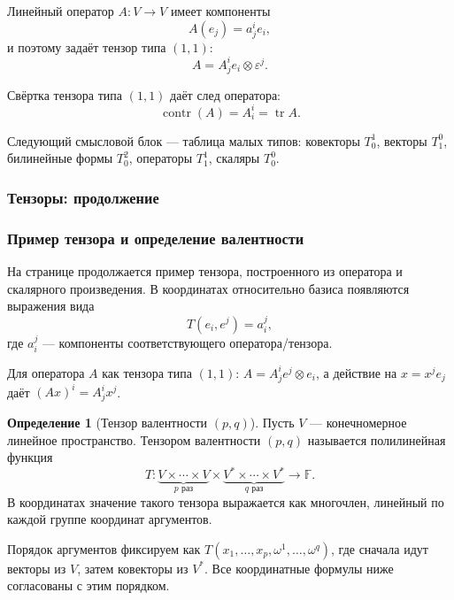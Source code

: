 \documentclass[12pt,a4paper]{article}
\theoremstyle{definition}
\newtheorem{definition}{Определение}[section]
\theoremstyle{plain}
\theoremstyle{remark}
\newenvironment{knowledgefix}{\begin{clarifybox}}{\end{clarifybox}}
\newcommand{\F}{\mathbb{F}}
\providecommand{\tr}{\operatorname{tr}}
\begin{document}
Линейный оператор $A:V\to V$ имеет компоненты
\[
    A(e_j)=a^i_j e_i,
\]
и поэтому задаёт тензор типа $(1,1)$:
\[
    A=A^i_j e_i\otimes\varepsilon^j.
\]

Свёртка тензора типа $(1,1)$ даёт след оператора:
\[
    \operatorname{contr}(A)=A^i_i=\tr A.
\]
\begin{knowledgefix}
Следующий смысловой блок — таблица малых типов: ковекторы \(T^1_0\), векторы \(T^0_1\), билинейные формы \(T^2_0\), операторы \(T^1_1\), скаляры \(T^0_0\).
\end{knowledgefix}



\subsubsection{Тензоры: продолжение}

\subsubsection*{Пример тензора и определение валентности}

На странице продолжается пример тензора, построенного из оператора и скалярного произведения. В координатах относительно базиса появляются выражения вида
\[
    T(e_i,e^j)=a_i^j,
\]
где $a_i^j$ --- компоненты соответствующего оператора/тензора.
\begin{knowledgefix}
Для оператора \(A\) как тензора типа \((1,1)\): \(A=A^i_j e^j\otimes e_i\), а действие на \(x=x^j e_j\) даёт \((Ax)^i=A^i_jx^j\).
\end{knowledgefix}

\begin{definition}[Тензор валентности $(p,q)$]
Пусть $V$ --- конечномерное линейное пространство. Тензором валентности $(p,q)$ называется полилинейная функция
\[
    T\colon \underbrace{V\times\cdots\times V}_{p\text{ раз}}
       \times
       \underbrace{V^*\times\cdots\times V^*}_{q\text{ раз}}
       \longrightarrow \F.
\]
В координатах значение такого тензора выражается как многочлен, линейный по каждой группе координат аргументов.
\begin{knowledgefix}
Порядок аргументов фиксируем как \(T(x_1,\ldots,x_p,\omega^1,\ldots,\omega^q)\), где сначала идут векторы из \(V\), затем ковекторы из \(V^*\). Все координатные формулы ниже согласованы с этим порядком.
\end{knowledgefix}
\end{definition}
\end{document}
